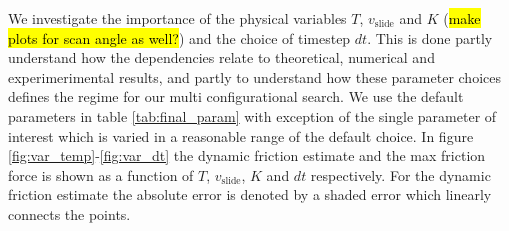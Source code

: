 We investigate the importance of the physical variables $T$, $v_{\text{slide}}$ and $K$ (\hl{make plots for scan angle as well?}) and the choice of timestep $dt$. This is done partly understand how the dependencies relate to theoretical, numerical and experimerimental results, and partly to understand how these parameter choices defines the regime for our multi configurational search. We use the default parameters in table \ref{tab:final_param} with exception of the single parameter of interest which is varied in a reasonable range of the default choice. In figure \ref{fig:var_temp}-\ref{fig:var_dt} the dynamic friction estimate and the max friction force is shown as a function of $T$, $v_{\text{slide}}$, $K$ and $dt$ respectively. For the dynamic friction estimate the absolute error is denoted by a shaded error which linearly connects the points.


